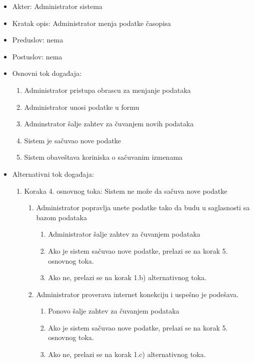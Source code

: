 \documentclass[a4paper]{article}
\begin{document}
\begin{itemize}
    \item Akter: Administrator sistema
    \item Kratak opis: Administrator menja podatke časopisa
    \item Preduslov: nema
    \item Postuslov: nema
    \item Osnovni tok događaja:
        \begin{enumerate}
            \item Administrator pristupa obrascu za menjanje podataka
            \item Administrator unosi podatke u formu
            \item Adminstrator šalje zahtev za čuvanjem novih podataka
            \item Sistem je sačuvao nove podatke
            \item Sistem obaveštava koriniska o sačuvanim izmenama
        \end{enumerate}
    \item Alternativni tok događaja:
        \begin{enumerate}
            \item Koraka 4. osnovnog toka: Sistem ne može da sačuva nove podatke
                \begin{enumerate}
                    \item Administrator popravlja unete podatke tako da budu u saglasnosti sa bazom podataka
                    \begin{enumerate}
                        \item Administrator šalje zahtev za čuvanjem podataka
                        \item Ako je sistem sačuvao nove podatke, prelazi se na korak 5. osnovnog toka.
                        \item Ako ne, prelazi se na korak 1.b) alternativnog toka.
                    \end{enumerate}
                    \item Administrator proverava internet konekciju i uspešno je podešava.
                    \begin{enumerate}
                        \item Ponovo šalje zahtev za čuvanjem podataka
                        \item Ako je sistem sačuvao nove podatke, prelazi se na korak 5. osnovnog toka.
                        \item Ako ne, prelazi se na korak 1.c) alternativnog toka.

\end{enumerate}
\end{enumerate}
\end{enumerate}
\end{itemize}
\end{document}

